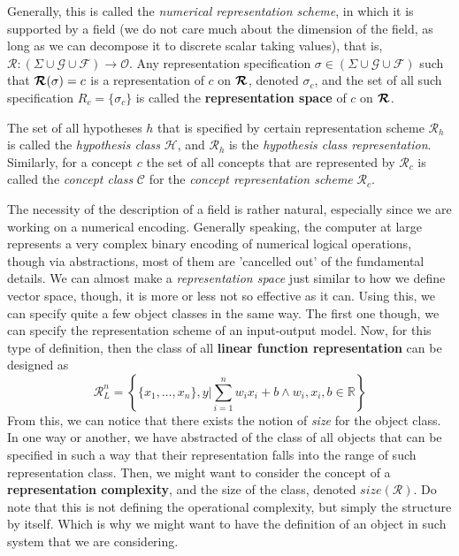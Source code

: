 \documentclass[10pt]{article} %
\begin{document}
Generally, this is called the \textit{numerical representation scheme}, in which it is supported by a field (we do not care much about the dimension of the field, as long as we can decompose it to discrete scalar taking values), that is, $\bm{\mathcal{R}}:(\Sigma \cup \mathcal{G}\cup \mathcal{F})\to \mathcal{O}$. Any representation specification $\sigma\in (\Sigma \cup \mathcal{G}\cup \mathcal{F})$ such that $\bm{\mathcal{R}}(\sigma) = c$ is a representation of $c$ on $\bm{\mathcal{R}}$, denoted $\sigma_{c}$, and the set of all such specification $R_{c}=\{\sigma_{c}\}$ is called the \textbf{representation space} of $c$ on $\bm{\mathcal{R}}$.

The set of all hypotheses $h$ that is specified by certain representation scheme $\bm{\mathcal{R}}_{h}$ is called the \textit{hypothesis class} $\mathcal{H}$, and $\bm{\mathcal{R}}_{h}$ is the \textit{hypothesis class representation}. Similarly, for a concept $c$ the set of all concepts that are represented by $\bm{\mathcal{R}}_{c}$ is called the \textit{concept class} $\mathcal{C}$ for the \textit{concept representation scheme} $\bm{\mathcal{R}}_{c}$.

The necessity of the description of a field is rather natural, especially since we are working on a numerical encoding. Generally speaking, the computer at large represents a very complex binary encoding of numerical logical operations, though via abstractions, most of them are 'cancelled out' of the fundamental details. We can almost make a \textit{representation space} just similar to how we define vector space, though, it is more or less not so effective as it can.
Using this, we can specify quite a few object classes in the same way. The first one though, we can specify the representation scheme of an input-output model. Now, for this type of definition, then the class of all \textbf{linear function representation} can be designed as 
\begin{equation}
    \bm{\mathcal{R}}_{L}^{n} = \left\{ \{x_{1},\dots,x_{n}\}, y \Bigg| \sum_{i=1}^{n}w_{i}x_{i} + b \land w_{i}, x_{i}, b \in \mathbb{R} \right\}
\end{equation}
From this, we can notice that there exists the notion of \textit{size} for the object class. In one way or another, we have abstracted of the class of all objects that can be specified in such a way that their representation falls into the range of such representation class. Then, we might want to consider the concept of a \textbf{representation complexity}, and the size of the class, denoted $size(\bm{\mathcal{R}})$. Do note that this is not defining the operational complexity, but simply the structure by itself. Which is why we might want to have the definition of an object in such system that we are considering.
\end{document}
